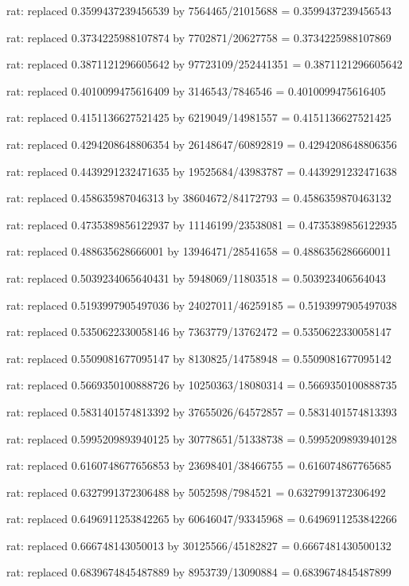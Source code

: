 \documentclass[a4paper,10pt]{article}
\begin{document}
\begin{eulernotebook}
\begin{eulercomment}
\begin{eulercomment}
\begin{eulercomment}
\begin{eulercomment}
\begin{eulercomment}
\begin{eulercomment}
\begin{eulercomment}
\begin{eulercomment}
\begin{eulercomment}
\begin{eulercomment}
\begin{eulercomment}
\begin{eulercomment}
\begin{eulercomment}
\begin{eulercomment}
\begin{eulercomment}
\begin{eulercomment}
\begin{euleroutput}
  rat: replaced 0.3599437239456539 by 7564465/21015688 = 0.3599437239456543
  
  rat: replaced 0.3734225988107874 by 7702871/20627758 = 0.3734225988107869
  
  rat: replaced 0.3871121296605642 by 97723109/252441351 = 0.3871121296605642
  
  rat: replaced 0.4010099475616409 by 3146543/7846546 = 0.4010099475616405
  
  rat: replaced 0.4151136627521425 by 6219049/14981557 = 0.4151136627521425
  
  rat: replaced 0.4294208648806354 by 26148647/60892819 = 0.4294208648806356
  
  rat: replaced 0.4439291232471635 by 19525684/43983787 = 0.4439291232471638
  
  rat: replaced 0.458635987046313 by 38604672/84172793 = 0.4586359870463132
  
  rat: replaced 0.4735389856122937 by 11146199/23538081 = 0.4735389856122935
  
  rat: replaced 0.488635628666001 by 13946471/28541658 = 0.4886356286660011
  
  rat: replaced 0.5039234065640431 by 5948069/11803518 = 0.503923406564043
  
  rat: replaced 0.5193997905497036 by 24027011/46259185 = 0.5193997905497038
  
  rat: replaced 0.5350622330058146 by 7363779/13762472 = 0.5350622330058147
  
  rat: replaced 0.5509081677095147 by 8130825/14758948 = 0.5509081677095142
  
  rat: replaced 0.5669350100888726 by 10250363/18080314 = 0.5669350100888735
  
  rat: replaced 0.5831401574813392 by 37655026/64572857 = 0.5831401574813393
  
  rat: replaced 0.5995209893940125 by 30778651/51338738 = 0.5995209893940128
  
  rat: replaced 0.6160748677656853 by 23698401/38466755 = 0.616074867765685
  
  rat: replaced 0.6327991372306488 by 5052598/7984521 = 0.6327991372306492
  
  rat: replaced 0.6496911253842265 by 60646047/93345968 = 0.6496911253842266
  
  rat: replaced 0.666748143050013 by 30125566/45182827 = 0.6667481430500132
  
  rat: replaced 0.6839674845487889 by 8953739/13090884 = 0.6839674845487899
  

\end{euleroutput}
\end{eulercomment}
\end{eulercomment}
\end{eulercomment}
\end{eulercomment}
\end{eulercomment}
\end{eulercomment}
\end{eulercomment}
\end{eulercomment}
\end{eulercomment}
\end{eulercomment}
\end{eulercomment}
\end{eulercomment}
\end{eulercomment}
\end{eulercomment}
\end{eulercomment}
\end{eulercomment}
\end{eulernotebook}
\end{document}
